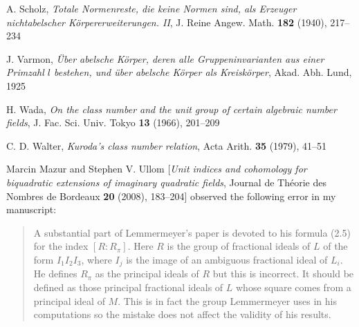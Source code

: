 \documentclass{amsart}
\begin{document}
\begin{thebibliography}{}
 A. Scholz,
{\em Totale Normenreste, die keine Normen sind, als Erzeuger
   nichtabelscher K\"orpererweiterungen. II},
J. Reine Angew. Math. {\bf 182} (1940), 217--234
%

 J. Varmon,
{\em \"Uber abelsche K\"orper, deren alle Gruppeninvarianten
    aus einer Primzahl $l$ bestehen, und \"uber abelsche
    K\"orper als Kreisk\"orper},
    Akad. Abh. Lund, 1925
%

 H. Wada,
{\em On the class number and the unit group of certain algebraic
    number fields}, J. Fac. Sci. Univ. Tokyo {\bf 13} (1966),
    201--209
%

 C. D. Walter,
{\em Kuroda's class number relation},
Acta Arith. {\bf 35} (1979), 41--51
%

\end{thebibliography}

\newpage

Marcin Mazur and Stephen V. Ullom [{\em Unit indices and cohomology for
    biquadratic extensions of imaginary quadratic fields},
  Journal de Th\'eorie des Nombres de Bordeaux {\bf 20} (2008), 183--204]
observed the following error in my manuscript:
\begin{quote}
  A substantial part of Lemmermeyer's paper is devoted to his formula (2.5)
  for the index $[R : R_\pi]$. Here $R$ is the group of fractional ideals of
  $L$ of the form $I_1I_2I_3$, where $I_j$ is the image of an ambiguous
  fractional ideal of $L_i$. He defines $R_\pi$ as the principal ideals of
  $R$ but this is incorrect. It should be defined as those principal
  fractional ideals of $L$ whose square comes from a principal ideal of $M$.
  This is in fact the group Lemmermeyer uses in his computations so
  the mistake does not affect the validity of his results.
\end{quote}
\end{document}
